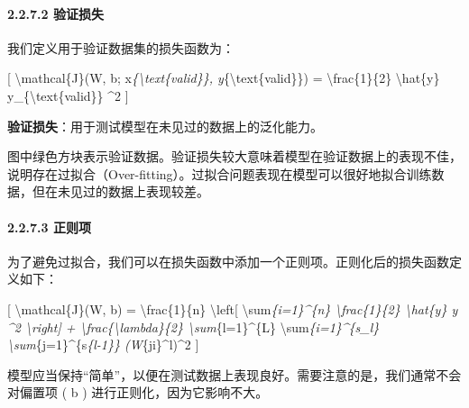 \paragraph{\texorpdfstring{\textbf{2.2.7.2
验证损失}}{2.2.7.2 验证损失}}\label{2272-ux9a8cux8bc1ux635fux5931}

我们定义用于验证数据集的损失函数为：

{[} \textbackslash mathcal\{J\}(W, b;
x\emph{\{\textbackslash text\{valid\}\},
y}\{\textbackslash text\{valid\}\}) = \textbackslash frac\{1\}\{2\}
\textbar{} \textbackslash hat\{y\} y\_\{\textbackslash text\{valid\}\}
\textbar{}\^{}2 {]}


\textbf{验证损失}：用于测试模型在未见过的数据上的泛化能力。

图中绿色方块表示验证数据。验证损失较大意味着模型在验证数据上的表现不佳，说明存在过拟合（Over-fitting）。过拟合问题表现在模型可以很好地拟合训练数据，但在未见过的数据上表现较差。


\paragraph{\texorpdfstring{\textbf{2.2.7.3}
\textbf{正则项}}{2.2.7.3 正则项}}\label{2273-ux6b63ux5219ux9879}

为了避免过拟合，我们可以在损失函数中添加一个正则项。正则化后的损失函数定义如下：

{[} \textbackslash mathcal\{J\}(W, b) = \textbackslash frac\{1\}\{n\}
\textbackslash left{[} \textbackslash sum\emph{\{i=1\}\^{}\{n\}
\textbackslash frac\{1\}\{2\} \textbar{} \textbackslash hat\{y\} y
\textbar{}\^{}2 \textbackslash right{]} +
\textbackslash frac\{\textbackslash lambda\}\{2\}
\textbackslash sum}\{l=1\}\^{}\{L\}
\textbackslash sum\emph{\{i=1\}\^{}\{s\_l\}
\textbackslash sum}\{j=1\}\^{}\{s\emph{\{l-1\}\} (W}\{ji\}\^{}l)\^{}2
{]}


模型应当保持``简单''，以便在测试数据上表现良好。需要注意的是，我们通常不会对偏置项
( b ) 进行正则化，因为它影响不大。

